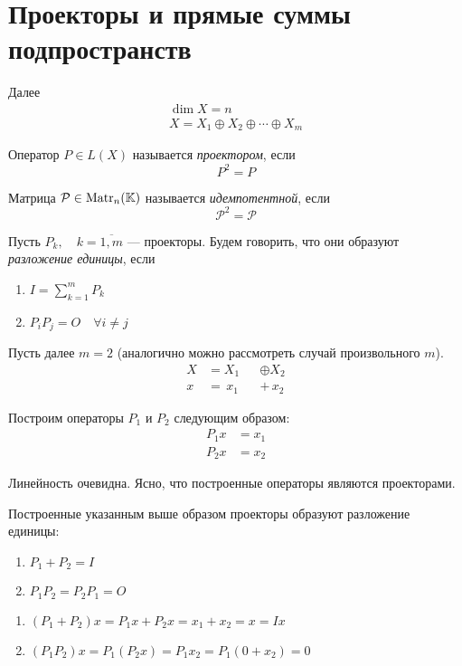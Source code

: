 \section{Проекторы и прямые суммы подпространств}
Далее 
\[
    \begin{gathered}
        \dim X = n \\
        X = X_1 \oplus X_2 \oplus \dotsb \oplus X_m
    \end{gathered}
\]

\begin{definition}
    Оператор $P \in L(X)$ называется \emph{проектором}, если
    \[ P^2 = P \]

    Матрица $\mathcal{P} \in \mathrm{Matr}_{n}({\mathbb{K}})$ называется \emph{идемпотентной}, если
    \[ \mathcal{P}^2 = \mathcal{P} \]
\end{definition}

\begin{definition}
    Пусть $ P_k, \quad k = \overline{1,m} $ — проекторы. Будем говорить, 
    что они образуют \emph{разложение единицы}, если
    \begin{enumerate}
        \item $I = \sum\limits_{k=1}^{m} P_k$
        \item $P_i P_j = O \quad \forall i \neq j$
    \end{enumerate}
\end{definition}

Пусть далее $m=2$ (аналогично можно рассмотреть случай произвольного $m$).
\[
    \begin{alignedat}{2}
        X &= X_1 &&\oplus X_2 \\
        x &= \,x_1 &&+ \,x_2
    \end{alignedat}
\]

Построим операторы $P_1$ и $P_2$ следующим образом:
\begin{align*}
    P_1 x &= x_1 \\
    P_2 x &= x_2 
\end{align*}

Линейность очевидна. Ясно, что построенные операторы являются проекторами.

\begin{lemma} \label{lemma:proj1}
    Построенные указанным выше образом проекторы образуют разложение единицы:
    \begin{enumerate}
        \item $P_1 + P_2 = I$
        \item $P_1 P_2 = P_2 P_1 = O$
    \end{enumerate}
\end{lemma}
\begin{proofbreak}
    \begin{enumerate}
        \item $(P_1 + P_2) x = P_1 x + P_2 x = x_1 + x_2 = x = Ix$
        \item $(P_1 P_2) x = P_1 (P_2 x) = P_1 x_2 = P_1 (0 + x_2) = 0$
    \end{enumerate}
\end{proofbreak}

